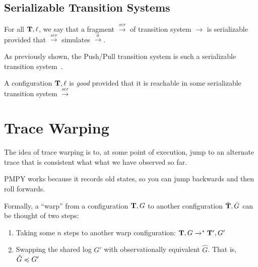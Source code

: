 \subsection{Serializable Transition Systems}


\begin{definition}
For all $\mathbf{T},\ell$, we say that a fragment 
$\xrightarrow{ser}$ of transition system $\xrightarrow{}$ is
serializable provided that 
$\xrightarrow{ser}$ simulates $\xrightarrow{a}$.
\end{definition}


As previously shown, the Push/Pull transition system is such a
serializable transition system~\cite{PMPY}.

\begin{definition}
A configuration $\mathbf{T},\ell$ is \emph{good} provided that it is reachable in
some serializable transition system $\xrightarrow{ser}$
\end{definition}






\section{Trace Warping}

The idea of trace warping is to, at some point of execution, jump to
an alternate trace that is consistent what what we have observed so
far. 


PMPY works because it records old states, so you can jump backwards
and then roll forwards.


Formally, a ``warp'' from a configuration $\mathbf{T},G$ to another
configuration $\hat{\mathbf{T}},\hat{G}$ can be thought of two steps:
\begin{enumerate}
\item Taking some $n$ steps to another warp configuration:
  $\mathbf{T},G \xrightarrow{}^{*} \mathbf{T}',G'$
\item Swapping the shared log $G'$ with observationally equivalent
  $\hat{G}$. That is,  $\hat{G} \preccurlyeq G'$
\end{enumerate}


